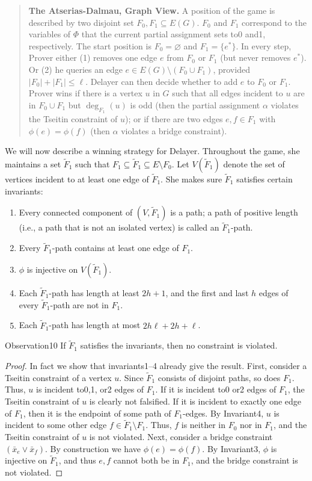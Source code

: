\begin{quote}
\textbf{The Atserias-Dalmau, Graph View.} A position of the game is described by two disjoint set $F_0,F_1\subseteq E(G)$. $F_0$ and $F_1$ correspond to the variables of $\Phi$ that the current partial assignment sets to0 and1, respectively. The start position is $F_0=\varnothing$ and $F_1=\{e^*\}$.
In every step, Prover either (1) removes one edge $e$ from $F_0$ or $F_1$ (but never removes $e^*$). Or (2) he queries an edge $e\in E(G)\setminus(F_0\cup F_1)$, provided $|F_0|+|F_1|\le\ell$. Delayer can then decide whether to add $e$ to $F_0$ or $F_1$.
Prover wins if there is a vertex $u$ in $G$ such that all edges incident to $u$ are in $F_0\cup F_1$ but $\deg_{F_1}(u)$ is odd (then the partial assignment $\alpha$ violates the Tseitin constraint of $u$); or if there are two edges $e,f\in F_1$ with $\phi(e)=\phi(f)$ (then $\alpha$ violates a bridge constraint).
\end{quote}
We will now describe a winning strategy for Delayer. Throughout the game, she maintains a set $\widetilde F_1$ such that $F_1\subseteq\widetilde F_1\subseteq E\setminus F_0$. Let $V(\widetilde F_1)$ denote the set of vertices incident to at least one edge of $\widetilde F_1$. She makes sure $\widetilde F_1$ satisfies certain invariants:
\begin{enumerate}
\item Every connected component of $(V,\widetilde F_1)$ is a path; a path of positive length (i.e., a path that is not an isolated vertex) is called an $\widetilde F_1$-path.
\item Every $\widetilde F_1$-path contains at least one edge of $F_1$.
\item $\phi$ is injective on $V(\widetilde F_1)$.
\item Each $\widetilde F_1$-path has length at least $2h+1$, and the first and last $h$ edges of every $\widetilde F_1$-path are not in $F_1$.
\item Each $\widetilde F_1$-path has length at most $2h\ell+2h+\ell$.
\end{enumerate}
\begin{authorclaim}{Observation10}
If $\widetilde F_1$ satisfies the invariants, then no constraint is violated.
\end{authorclaim}
\begin{proof}
In fact we show that invariants1–4 already give the result. First, consider a Tseitin constraint of a vertex $u$. Since $\widetilde F_1$ consists of disjoint paths, so does $F_1$. Thus, $u$ is incident to0,1, or2 edges of $F_1$. If it is incident to0 or2 edges of $F_1$, the Tseitin constraint of $u$ is clearly not falsified. If it is incident to exactly one edge of $F_1$, then it is the endpoint of some path of $F_1$-edges. By Invariant4, $u$ is incident to some other edge $f\in\widetilde F_1\setminus F_1$. Thus, $f$ is neither in $F_0$ nor in $F_1$, and the Tseitin constraint of $u$ is not violated.
Next, consider a bridge constraint $(\bar x_e\vee\bar x_f)$. By construction we have $\phi(e)=\phi(f)$. By Invariant3, $\phi$ is injective on $\widetilde F_1$, and thus $e,f$ cannot both be in $F_1$, and the bridge constraint is not violated.
\end{proof}
